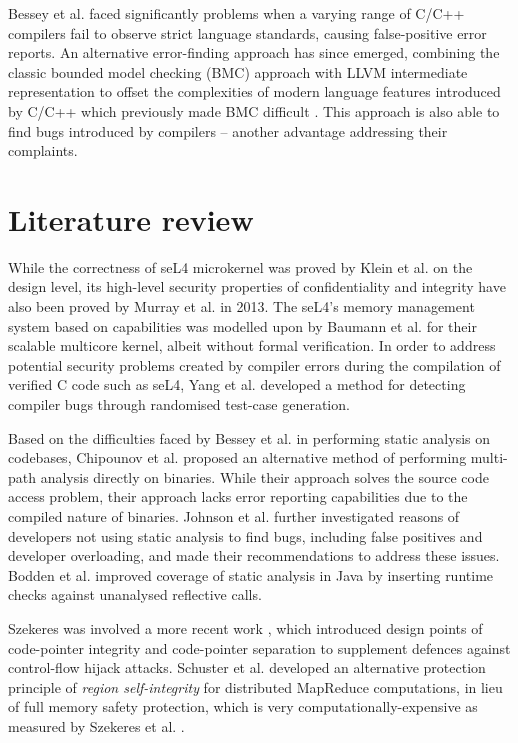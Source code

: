 \documentclass[11pt]{article}
\begin{document}
Bessey et al. \cite{bessey2010few} faced significantly problems when a varying range of C/C++ compilers fail to observe strict language standards, causing false-positive error reports. An alternative error-finding approach has since emerged, combining the classic bounded model checking (BMC) approach with LLVM intermediate representation to offset the complexities of modern language features introduced by C/C++ which previously made BMC difficult \cite{merz2012llbmc}. This approach is also able to find bugs introduced by compilers -- another advantage addressing their complaints.

\section{Literature review}

While the correctness of seL4 microkernel was proved by Klein et al. \cite{klein2009sel4} on the design level, its high-level security properties of confidentiality and integrity have also been proved by Murray et al. \cite{murray2013sel4} in 2013. The seL4's memory management system based on capabilities was modelled upon by Baumann et al. \cite{baumann2009multikernel} for their scalable multicore kernel, albeit without formal verification. In order to address potential security problems created by compiler errors during the compilation of verified C code such as seL4, Yang et al. \cite{yang2011finding} developed a method for detecting compiler bugs through randomised test-case generation. 

Based on the difficulties faced by Bessey et al. \cite{bessey2010few} in performing static analysis on codebases, Chipounov et al.  \cite{chipounov2011s2e} proposed an alternative method of performing multi-path analysis directly on binaries. While their approach solves the source code access problem, their approach lacks error reporting capabilities due to the compiled nature of binaries. Johnson et al. \cite{johnson2013don} further investigated reasons of developers not using static analysis to find bugs, including false positives and developer overloading, and made their recommendations to address these issues. Bodden et al. \cite{bodden2011taming} improved coverage of static analysis in Java by inserting runtime checks against unanalysed reflective calls.

Szekeres was involved a more recent work \cite{kuznetsov2014code}, which introduced design points of code-pointer integrity and code-pointer separation to supplement defences against control-flow hijack attacks. Schuster et al. \cite{schuster2015vc3} developed an alternative protection principle of \emph{region self-integrity} for distributed MapReduce computations, in lieu of full memory safety protection, which is very computationally-expensive as measured by Szekeres et al. \cite{szekeres2013sok}. 


\footnotesize{}
\end{document}
